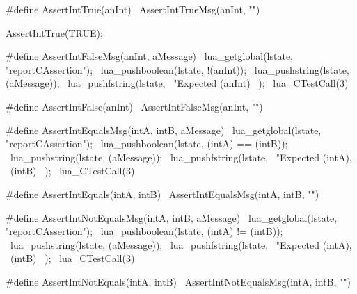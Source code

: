 #define AssertIntTrue(anInt) \
  AssertIntTrueMsg(anInt, "")
\stopCHeader

\startCTest
  AssertIntTrue(TRUE);
\stopCTest
\stopTestCase
\stopTestSuite

\startTestSuite[assertIntFalse]

\startCHeader
#define AssertIntFalseMsg(anInt, aMessage)   \
  lua_getglobal(lstate, "reportCAssertion"); \
  lua_pushboolean(lstate, !(anInt));         \
  lua_pushstring(lstate, (aMessage));        \
  lua_pushfstring(lstate,                    \
      "Expected %
      (anInt)                                \
    );                                       \
  lua_CTestCall(3)

#define AssertIntFalse(anInt) \
  AssertIntFalseMsg(anInt, "")
\stopCHeader

\stopTestSuite

\startTestSuite[assertIntEquals]

\startCHeader
#define AssertIntEqualsMsg(intA, intB, aMessage) \
  lua_getglobal(lstate, "reportCAssertion");     \
  lua_pushboolean(lstate, (intA) == (intB));     \
  lua_pushstring(lstate, (aMessage));            \
  lua_pushfstring(lstate,                        \
      "Expected %
      (intA),                                    \
      (intB)                                     \
    );                                           \
  lua_CTestCall(3)

#define AssertIntEquals(intA, intB) \
  AssertIntEqualsMsg(intA, intB, "")
\stopCHeader

\stopTestSuite

\startTestSuite[assertIntNotEquals]

\startCHeader
#define AssertIntNotEqualsMsg(intA, intB, aMessage) \
  lua_getglobal(lstate, "reportCAssertion");        \
  lua_pushboolean(lstate, (intA) != (intB));        \
  lua_pushstring(lstate, (aMessage));               \
  lua_pushfstring(lstate,                           \
      "Expected %
      (intA),                                       \
      (intB)                                        \
    );                                              \
  lua_CTestCall(3)

#define AssertIntNotEquals(intA, intB) \
  AssertIntNotEqualsMsg(intA, intB, "")
\stopCHeader

\stopTestSuite

\startTestSuite[assertPrtNull]

